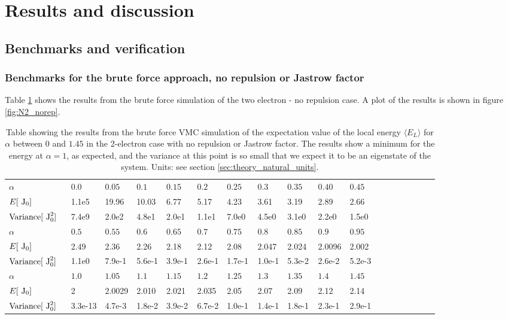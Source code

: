 \section{Results and discussion}

\subsection{Benchmarks and verification} \label{sec:res_benchmarks}

\subsubsection{Benchmarks for the brute force approach, no repulsion or Jastrow factor} \label{sec:res_N2N6_norep}
Table \ref{tab:N2_norep} shows the results from the brute force simulation of the two electron - no repulsion case. 
A plot of the results is shown in figure \ref{fig:N2_norep}. 

\begin{table}[h!]
	\centering 
	\begin{tabular}{l @{ } l @{ } l @{ } l @{ } l @{ } l @{ } l @{ } l @{ } l @{ } l @{ } l @{ } l @{ } l @{ } l @{ } l @{ } l @{ } l @{ } l}
		\toprule
		$\alpha~~~~$ & $0.0~~~~$ & $0.05~~~~$ & $0.1~~~~$ & $0.15~~~~$  & $0.2~~~~$ & $0.25~~~~$ & $0.3~~~~$ & $0.35~~~~$ & $0.40~~~~$ & $0.45~~~~$  \\
		\shaderow $E [~\textrm{J}_0] $ & 1.1e5 & 19.96 & 10.03 & 6.77 & 5.17 & 4.23 & 3.61 & 3.19 & 2.89 & 2.66  \\ 
		$\textrm{Variance} [~\textrm{J}_0^2] ~~$ & 7.4e9 & 2.0e2 & 4.8e1 & 2.0e1 & 1.1e1 & 7.0e0 & 4.5e0 & 3.1e0 & 2.2e0 & 1.5e0  \\ 
		\midrule
		$\alpha~~$ & $0.5~~$ & $0.55~~$ & $0.6 ~~$  & $0.65 ~~$ & $0.7~~$ &  $0.75~~$ & $0.8~~$ & $0.85~~$  & $0.9~~$ & $0.95~~$ \\
		\shaderow $E [~\textrm{J}_0] $  & 2.49 & 2.36 & 2.26 & 2.18 & 2.12 & 2.08 & 2.047 & 2.024 & 2.0096 & 2.002 \\ 
		$\textrm{Variance} [~\textrm{J}_0^2]$  
		& 1.1e0 & 7.9e-1 & 5.6e-1 & 3.9e-1 & 2.6e-1 & 1.7e-1 & 1.0e-1 & 5.3e-2 & 2.6e-2 & 5.2e-3 \\
		\midrule
		$\alpha~~$ & $1.0~~$ & $1.05~~$ & $1.1~~$ & $1.15~~$  & $1.2~~$ & $1.25~~$ & $1.3 ~~$  & $1.35 ~~$ & $1.4 ~~$ & $1.45~~$ \\ 
		\shaderow $E [~\textrm{J}_0] $ & 2 & 2.0029 & 2.010 & 2.021 & 2.035 & 2.05 & 2.07 & 2.09 & 2.12 & 2.14 \\ 
		$\textrm{Variance} [~\textrm{J}_0^2]$ & 3.3e-13 & 4.7e-3 & 1.8e-2 & 3.9e-2 & 6.7e-2 & 1.0e-1 & 1.4e-1 & 1.8e-1 & 2.3e-1 & 2.9e-1 \\ 
	\bottomrule
	\end{tabular}
	\caption{Table showing the results from the brute force VMC simulation of the expectation value of the local energy $\langle E_L \rangle$ for $\alpha$ between $0$ and $1.45$ in the 2-electron case with no repulsion or Jastrow factor. 
	The results show a minimum for the energy at $\alpha = 1$, as expected, and the variance at this point is so small that we expect it to be an eigenstate of the system.
	Units: see section \ref{sec:theory_natural_units}.}
	\label{tab:N2_norep}
\end{table}


